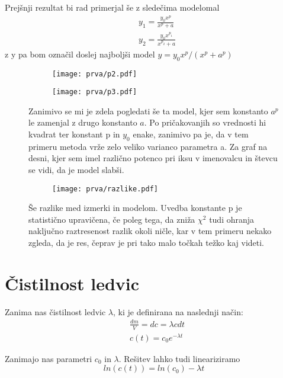 \documentclass{article}
\begin{document}
Prejšnji rezultat bi rad primerjal še z sledečima modelomal
\begin{align*}
&y_1 = \frac{y_0 x^p}{x^p + a} \\
&y_2 = \frac{y_0 x^{p_1}}{x^{p_2}+a}
\end{align*}
z y pa bom označil doslej najboljši model $y=y_0 x^p/(x^p + a^p)$

\begin{figure}[H]
\begin{subfigure}{.49\textwidth}
\texttt{[image: prva/p2.pdf]}
\end{subfigure}
\begin{subfigure}{.49\textwidth}
\texttt{[image: prva/p3.pdf]}
\end{subfigure}
\caption*{Zanimivo se mi je zdela pogledati še ta model, kjer sem konstanto $a^p$ le zamenjal z drugo konstanto $a$. Po pričakovanjih so vrednosti hi kvadrat ter konstant p in $y_0$ enake, zanimivo pa je, da v tem primeru metoda vrže zelo veliko varianco parametra a. Za graf na desni, kjer sem imel različno potenco pri iksu v imenovalcu in števcu se vidi, da je model slabši.}
\end{figure}
\begin{figure}[H]
\centering
\begin{subfigure}{.49\textwidth}
\texttt{[image: prva/razlike.pdf]}
\end{subfigure}
\caption*{Še razlike med izmerki in modelom. Uvedba konstante p je statistično upravičena, če poleg tega, da zniža $\chi^2$ tudi ohranja naključno raztresenost razlik okoli ničle, kar v tem primeru nekako zgleda, da je res, čeprav je pri tako malo točkah težko kaj videti.}
\end{figure}

\newpage 
\section{Čistilnost ledvic}
Zanima nas čistilnost ledvic $\lambda$, ki je definirana na naslednji način:
\begin{align*}
&\frac{dm}{V} = dc = \lambda c dt \\
&c(t) = c_0 e^{-\lambda t}
\end{align*}

Zanimajo nas parametri $c_0$ in $\lambda$. Rešitev lahko tudi lineariziramo
\begin{equation*}
ln(c(t)) = ln(c_0) - \lambda t
\end{equation*}
\end{document}
